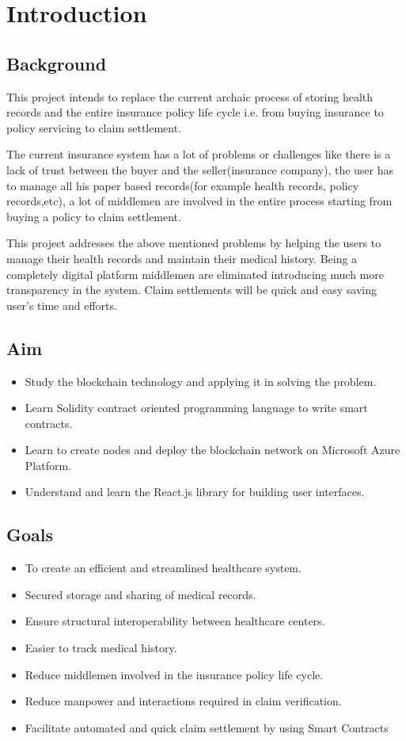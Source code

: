 \chapter{Introduction}

\section{Background}
This project intends to replace the current archaic process of storing health records and the entire insurance policy life cycle i.e. from buying insurance to policy servicing to claim settlement.

The current insurance system has a lot of problems or challenges like there is a lack of trust between the buyer and the seller(insurance company), the user has to manage all his paper based records(for example health records, policy records,etc), a lot of middlemen are involved in the entire process starting from buying a policy to claim settlement.
    
This project addresses the above mentioned problems by helping the users to manage their health records and maintain their medical history. Being a completely digital platform middlemen are eliminated introducing much more transparency in the system. Claim settlements will be quick and easy saving user’s time and efforts.
\section{Aim}
\begin{itemize}
	\item Study the blockchain technology and applying it in solving the problem.
	\item Learn Solidity contract oriented programming language to write smart contracts.
	\item Learn to create nodes and deploy the blockchain network on Microsoft Azure Platform.
	\item 	Understand and learn the React.js library for building user interfaces.
\end{itemize}
     
\section{Goals}
\begin{itemize}
	\item To create an efficient and streamlined healthcare system.
	\item Secured storage and sharing of medical records.
	\item	Ensure structural interoperability between healthcare centers.
	\item Easier to track medical history.
	\item Reduce middlemen involved in the insurance policy life cycle.
	\item Reduce manpower and interactions required in claim verification.
	\item Facilitate automated and quick claim settlement by using Smart Contracts
\end{itemize}
